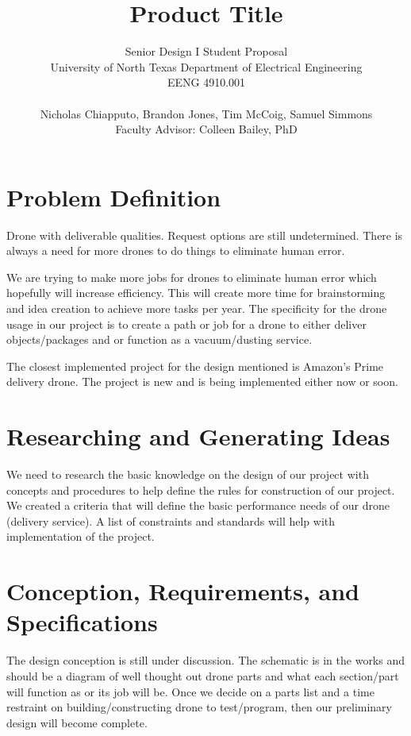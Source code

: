 \documentclass[conference]{IEEEtran}
\begin{document}
	\title{ Product Title }

	\author{	Senior Design I Student Proposal \\
				University of North Texas Department of Electrical Engineering \\
				EENG 4910.001 \\ \\
				Nicholas Chiapputo, Brandon Jones, Tim McCoig, Samuel Simmons \\
				Faculty Advisor: Colleen Bailey, PhD
	}

	\maketitle


	\section{Problem Definition}
		Drone with deliverable qualities. Request options are still undetermined. There is always a need for more drones to do things to eliminate human error.

		We are trying to make more jobs for drones to eliminate human error which hopefully will increase efficiency. This will create more time for brainstorming and idea creation to achieve more tasks per year. The specificity for the drone usage in our project is to create a path or job for a drone to either deliver objects/packages and or function as a vacuum/dusting service.

		The closest implemented project for the design mentioned is Amazon’s Prime delivery drone. The project is new and is being implemented either now or soon.

	\section{Researching and Generating Ideas}
		We need to research the basic knowledge on the design of our project with concepts and procedures to help define the rules for construction of our project. We created a criteria that will define the basic performance needs of our drone (delivery service). A list of constraints and standards will help with implementation of the project.

	\section{Conception, Requirements, and Specifications}
		The design conception is still under discussion. The schematic is in the works and should be a diagram of well thought out drone parts and what each section/part will function as or its job will be. Once we decide on a parts list and a time restraint on building/constructing drone to test/program, then our preliminary design will become complete.
	
\end{document}
